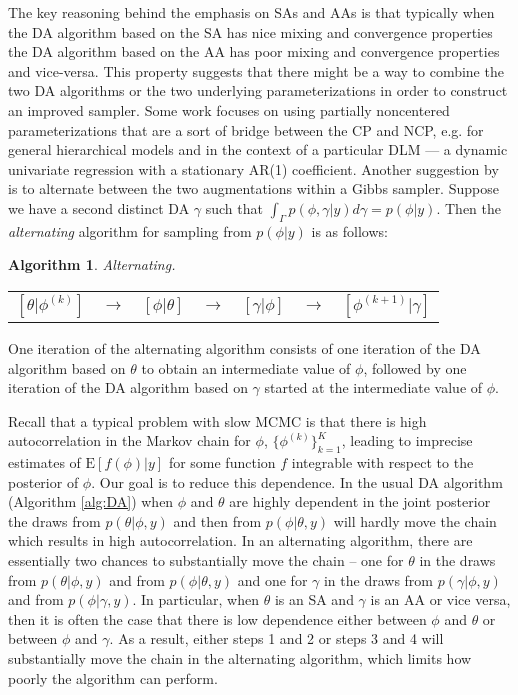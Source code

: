 \documentclass{article}
\newtheorem{alg}{Algorithm}
\begin{document}
The key reasoning behind the emphasis on SAs and AAs is that typically when the DA algorithm based on the SA has nice mixing and convergence properties the DA algorithm based on the AA has poor mixing and convergence properties and vice-versa. This property suggests that there might be a way to combine the two DA algorithms or the two underlying parameterizations in order to construct an improved sampler. Some work focuses on using partially noncentered parameterizations that are a sort of bridge between the CP and NCP, e.g.  for general hierarchical models and  in the context of a particular DLM --- a dynamic univariate regression with a stationary AR(1) coefficient. Another suggestion by  is to alternate between the two augmentations within a Gibbs sampler. Suppose we have a second distinct DA $\gamma$ such that $\int_\Gamma p(\phi,\gamma|y)d\gamma = p(\phi|y)$. Then the {\it alternating} algorithm for sampling from $p(\phi|y)$ is as follows:
\begin{alg}Alternating.\label{alg:Alt} \\
  \begin{center}
    \begin{tabular}{lllllll}
  $[\theta|\phi^{(k)}]$& $\to$& $[\phi|\theta]$& $\to$& $[\gamma|\phi]$& $\to$& $[\phi^{(k+1)}|\gamma]$
    \end{tabular}
  \end{center}
\end{alg}
\noindent One iteration of the alternating algorithm consists of one iteration of the DA algorithm based on $\theta$ to obtain an intermediate value of $\phi$, followed by one iteration of the DA algorithm based on $\gamma$ started at the intermediate value of $\phi$. 

Recall that a typical problem with slow MCMC is that there is high autocorrelation in the Markov chain for $\phi$, $\{\phi^{(k)}\}_{k=1}^K$, leading to imprecise estimates of $\mathrm{E}[f(\phi)|y]$ for some function $f$ integrable with respect to the posterior of $\phi$. Our goal is to reduce this dependence. In the usual DA algorithm (Algorithm \ref{alg:DA}) when $\phi$ and $\theta$ are highly dependent in the joint posterior the draws from $p(\theta|\phi,y)$ and then from $p(\phi|\theta,y)$ will hardly move the chain which results in high autocorrelation. In an alternating algorithm, there are essentially two chances to substantially move the chain -- one for $\theta$ in the draws from $p(\theta|\phi,y)$ and from $p(\phi|\theta,y)$ and one for $\gamma$ in the draws from $p(\gamma|\phi,y)$ and from $p(\phi|\gamma,y)$.  In particular, when $\theta$ is an SA and $\gamma$ is an AA or vice versa, then it is often the case that there is low dependence either between $\phi$ and $\theta$ or between $\phi$ and $\gamma$. As a result, either steps 1 and 2 or steps 3 and 4 will substantially move the chain in the alternating algorithm, which limits how poorly the algorithm can perform.
\end{document}
